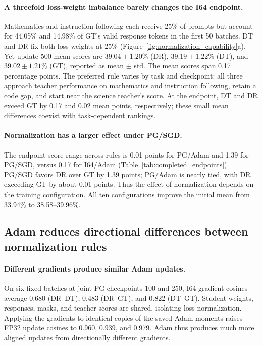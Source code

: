 \paragraph{A threefold loss-weight imbalance barely changes the I64 endpoint.}
Mathematics and instruction following each receive 25\% of prompts but account for 44.05\% and 14.98\% of GT's valid response tokens in the first 50 batches. DT and DR fix both loss weights at 25\% (Figure~\ref{fig:normalization_capability}a). Yet update-500 mean scores are $39.04\pm1.20$\% (DR), $39.19\pm1.22$\% (DT), and $39.02\pm1.21$\% (GT), reported as mean $\pm$ std. The mean scores span 0.17 percentage points. The preferred rule varies by task and checkpoint: all three approach teacher performance on mathematics and instruction following, retain a code gap, and start near the science teacher's score. At the endpoint, DT and DR exceed GT by 0.17 and 0.02 mean points, respectively; these small mean differences coexist with task-dependent rankings.



\paragraph{Normalization has a larger effect under PG/SGD.}
The endpoint score range across rules is 0.01 points for PG/Adam and 1.39 for PG/SGD, versus 0.17 for I64/Adam (Table~\ref{tab:completed_endpoints}). PG/SGD favors DR over GT by 1.39 points; PG/Adam is nearly tied, with DR exceeding GT by about 0.01 points. Thus the effect of normalization depends on the training configuration. All ten configurations improve the initial mean from 33.94\% to 38.58--39.96\%.



\subsection{Adam reduces directional differences between normalization rules}

\paragraph{Different gradients produce similar Adam updates.}
On six fixed batches at joint-PG checkpoints 100 and 250, I64 gradient cosines average 0.680 (DR--DT), 0.483 (DR--GT), and 0.822 (DT--GT). Student weights, responses, masks, and teacher scores are shared, isolating loss normalization. Applying the gradients to identical copies of the saved Adam moments raises FP32 update cosines to 0.960, 0.939, and 0.979. Adam thus produces much more aligned updates from directionally different gradients.


